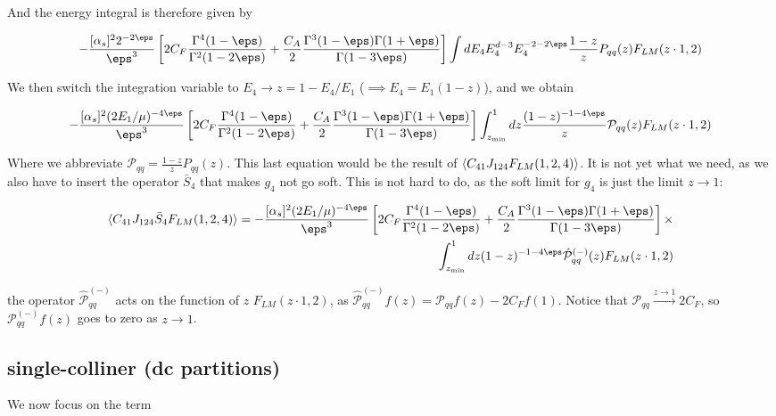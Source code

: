 \documentclass[11pt]{report}
\begin{document}
And the energy integral is therefore given by 

\begin{align}
    -\frac{[\alpha_s]^22^{-2\eps}}{\eps^3}\left[ 2C_F\frac{\Gamma^4(1-\eps)}{\Gamma^2(1-2\eps)} + \frac{C_A}{2}\frac{\Gamma^3(1-\eps)\Gamma(1+\eps)}{\Gamma(1-3\eps)}\right]\int dE_4 E_4^{d-3} E_4^{-2-2\eps} \frac{1-z}{z}P_{qq}(z) F_{LM}(z\cdot 1, 2)
\end{align}

We then switch the integration variable to \(E_4 \to z = 1-E_4/E_1\) (\(\implies E_4 = E_1(1-z)\)), and we obtain 

\begin{align}
    -\frac{[\alpha_s]^2(2E_1/\mu)^{-4\eps}}{\eps^3}\left[ 2C_F\frac{\Gamma^4(1-\eps)}{\Gamma^2(1-2\eps)} + \frac{C_A}{2}\frac{\Gamma^3(1-\eps)\Gamma(1+\eps)}{\Gamma(1-3\eps)}\right]\int_{z_{\min}}^1 dz \frac{(1-z)^{-1-4\eps}}{z}\mathcal{P}_{qq}(z) F_{LM}(z\cdot 1, 2)
\end{align}

Where we abbreviate \(\mathcal{P}_{qq} = \frac{1-z}{z}P_{qq}(z)\). This last equation would be the result of \(\braket{C_{41}J_{124}F_{LM}(1,2, 4)}\). It is not yet what we need, as we also have to insert the operator \(\bar{S}_4\) that makes \(g_4\) not go soft. This is not hard to do, as the soft limit for \(g_4\) is just the limit \(z\to 1\): 

\begin{align}
    \braket{C_{41}J_{124}\bar{S}_4F_{LM}(1,2, 4)} = -\frac{[\alpha_s]^2(2E_1/\mu)^{-4\eps}}{\eps^3}\left[ 2C_F\frac{\Gamma^4(1-\eps)}{\Gamma^2(1-2\eps)} + \frac{C_A}{2}\frac{\Gamma^3(1-\eps)\Gamma(1+\eps)}{\Gamma(1-3\eps)}\right] \times \\ 
    \int_{z_{\min}}^1 dz (1-z)^{-1-4\eps}\hat{\mathcal{P}}^{(-)}_{qq}(z)F_{LM}(z\cdot 1, 2)
\end{align}

the operator \(\hat{\mathcal{P}}^{(-)}_{qq}\) acts on the function of \(z\) \(F_{LM}(z\cdot1, 2)\), as \(\hat{\mathcal{P}}^{(-)}_{qq} f(z) = \mathcal{P}_{qq}f(z) - 2C_F f(1)\). Notice that \(\mathcal{P}_{qq} \xrightarrow{z\to 1} 2C_F\), so \(\mathcal{P}^{(-)}_{qq} f(z)\) goes to zero as \(z \to 1\). 

\subsection{single-colliner (dc partitions)}

We now focus on the term
\end{document}
